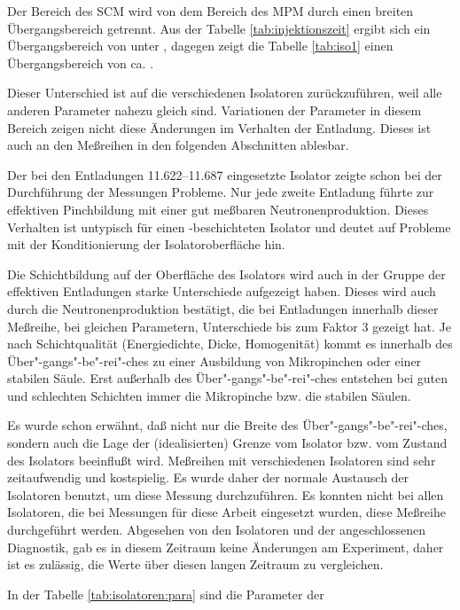 %
\par
Der Bereich des SCM wird von dem Bereich des MPM durch einen breiten
Übergangsbereich getrennt. Aus der Tabelle \vref{tab:injektionszeit}
ergibt sich ein Übergangsbereich von unter , dagegen zeigt
die Tabelle \vref{tab:iso1} einen Übergangsbereich von ca.
.
\par
Dieser Unterschied ist auf die verschiedenen Isolatoren zurückzuführen,
weil alle anderen Parameter nahezu gleich sind. Variationen der
Parameter in diesem Bereich zeigen nicht diese Änderungen im Verhalten
der Entladung. Dieses ist auch an den Meßreihen in den folgenden
Abschnitten ablesbar.
\par
Der bei den Entladungen 11.622--11.687 eingesetzte Isolator zeigte
schon bei der Durchführung der Messungen Probleme. Nur jede zweite
Entladung führte zur effektiven Pinchbildung mit einer gut meßbaren
Neutronenproduktion. Dieses Verhalten ist untypisch für einen
\AlO-beschichteten Isolator und deutet auf Probleme mit der
Konditionierung der Isolatoroberfläche hin.
\par
\label{sec:uebergangsbereich} Die Schichtbildung auf der
Oberfläche des Isolators wird auch in der Gruppe der effektiven
Entladungen starke Unterschiede aufgezeigt haben. Dieses wird auch
durch die Neutronenproduktion bestätigt, die bei Entladungen
innerhalb dieser Meßreihe, bei gleichen Parametern, Unterschiede
bis zum Faktor 3 gezeigt hat. Je nach Schichtqualität
(Energiedichte, Dicke, Homogenität) kommt es innerhalb des
Über"-gangs"-be"-rei"-ches zu einer Ausbildung von Mikropinchen
oder einer stabilen Säule. Erst außerhalb des
Über"-gangs"-be"-rei"-ches entstehen bei guten und schlechten
Schichten immer die Mikropinche bzw. die stabilen Säulen.
\par
Es wurde schon erwähnt, daß nicht nur die Breite des
Über"-gangs"-be"-rei"-ches, sondern auch die Lage der
(idealisierten) Grenze vom Isolator bzw. vom Zustand des Isolators
beeinflußt wird. Meßreihen mit verschiedenen Isolatoren sind sehr
zeitaufwendig und kostspielig. Es wurde daher der normale
Austausch der Isolatoren benutzt, um diese Messung durchzuführen.
Es konnten nicht bei allen Isolatoren, die bei Messungen für diese
Arbeit eingesetzt wurden, diese Meßreihe durchgeführt werden.
Abgesehen von den Isolatoren und der angeschlossenen Diagnostik,
gab es in diesem Zeitraum keine Änderungen am Experiment, daher
ist es zulässig, die Werte über diesen langen Zeitraum zu
vergleichen.
\par
In der Tabelle \vref{tab:isolatoren:para} sind die Parameter der
